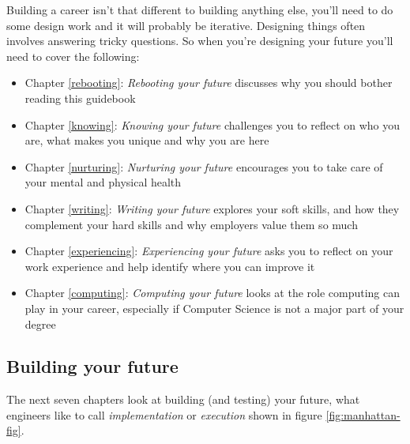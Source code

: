 \documentclass[
]{book}
\providecommand{\tightlist}{%
  \setlength{\itemsep}{0pt}\setlength{\parskip}{0pt}}
\begin{document}
Building a career isn't that different to building anything else, you'll need to do some design work and it will probably be iterative. Designing things often involves answering tricky questions. So when you're designing your future you'll need to cover the following:

\begin{itemize}
\tightlist
\item
  Chapter \ref{rebooting}: \emph{Rebooting your future} discusses why you should bother reading this guidebook
\item
  Chapter \ref{knowing}: \emph{Knowing your future} challenges you to reflect on who you are, what makes you unique and why you are here
\item
  Chapter \ref{nurturing}: \emph{Nurturing your future} encourages you to take care of your mental and physical health
\item
  Chapter \ref{writing}: \emph{Writing your future} explores your soft skills, and how they complement your hard skills and why employers value them so much
\item
  Chapter \ref{experiencing}: \emph{Experiencing your future} asks you to reflect on your work experience and help identify where you can improve it
\item
  Chapter \ref{computing}: \emph{Computing your future} looks at the role computing can play in your career, especially if Computer Science is not a major part of your degree
\end{itemize}

\hypertarget{partii}{%
\subsection{Building your future}\label{partii}}

The next seven chapters look at building (and testing) your future, what engineers like to call \emph{implementation} or \emph{execution} shown in figure \ref{fig:manhattan-fig}.
\end{document}
